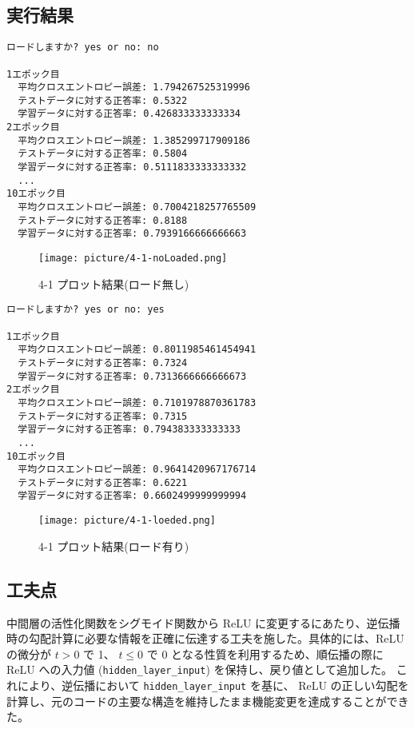 \documentclass[11px,a4,dvipdfmx]{jsarticle}
\begin{document}
\subsection{実行結果}
\begin{verbatim}
ロードしますか? yes or no: no

1エポック目
  平均クロスエントロピー誤差: 1.794267525319996
  テストデータに対する正答率: 0.5322
  学習データに対する正答率: 0.426833333333334
2エポック目
  平均クロスエントロピー誤差: 1.385299717909186
  テストデータに対する正答率: 0.5804
  学習データに対する正答率: 0.5111833333333332
  ...
10エポック目
  平均クロスエントロピー誤差: 0.7004218257765509
  テストデータに対する正答率: 0.8188
  学習データに対する正答率: 0.7939166666666663
\end{verbatim}
 \begin{figure}[H]
		      \begin{center}
			      \texttt{[image: picture/4-1-noLoaded.png]}
			      \caption{4-1 プロット結果(ロード無し)}
		      \end{center}
\end{figure}
\begin{verbatim}
ロードしますか? yes or no: yes

1エポック目
  平均クロスエントロピー誤差: 0.8011985461454941
  テストデータに対する正答率: 0.7324
  学習データに対する正答率: 0.7313666666666673
2エポック目
  平均クロスエントロピー誤差: 0.7101978870361783
  テストデータに対する正答率: 0.7315
  学習データに対する正答率: 0.794383333333333
  ...
10エポック目
  平均クロスエントロピー誤差: 0.9641420967176714
  テストデータに対する正答率: 0.6221
  学習データに対する正答率: 0.6602499999999994
\end{verbatim}
 \begin{figure}[H]
		      \begin{center}
			      \texttt{[image: picture/4-1-loeded.png]}
			      \caption{4-1 プロット結果(ロード有り)}
		      \end{center}
\end{figure}
\subsection{工夫点}
中間層の活性化関数をシグモイド関数から ReLU に変更するにあたり、逆伝播時の勾配計算に必要な情報を正確に伝達する工夫を施した。具体的には、ReLU の微分が $t>0$ で 1、 $t \le 0$ で 0 となる性質を利用するため、順伝播の際に ReLU への入力値 (\texttt{hidden\_layer\_input}) を保持し、戻り値として追加した。
これにより、逆伝播において \texttt{hidden\_layer\_input} を基に、
ReLU の正しい勾配を計算し、元のコードの主要な構造を維持したまま機能変更を達成することができた。
\end{document}
